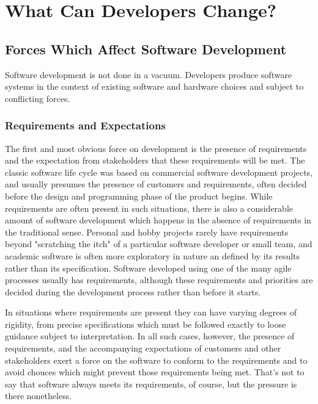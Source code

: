 \chapter{What Can Developers Change?}
\label{chapter:change}

\section{Forces Which Affect Software Development}
\label{section:forces which affect software development}

Software development is not done in a vacuum. Developers produce software systems in the context of existing software and hardware choices and subject to conflicting forces.

\subsection{Requirements and Expectations}
The first and most obvious force on development is the presence of requirements and the expectation from stakeholders that these requirements will be met. The classic software life cycle was based on commercial software development projects, and usually presumes the presence of customers and requirements, often decided before the design and programming phase of the product begins. While requirements are often present in such situations, there is also a considerable amount of software development which happens in the absence of requirements in the traditional sense. Personal and hobby projects rarely have requirements beyond "scratching the itch"  of a particular software developer or small team, and academic software is often more exploratory in nature an defined by its results rather than its specification. Software developed using one of the many agile processes  usually has requirements, although these requirements and priorities are decided during the development process rather than before it starts.

In situations where requirements are present they can have varying degrees of rigidity, from precise specifications which must be followed exactly to loose guidance subject to interpretation. In all such cases, however, the presence of requirements, and the accompanying expectations of customers and other stakeholders exert a force on the software to conform to the requirements and to avoid chouces which might prevent those requirements being met. That's not to say that software always meets its requirements, of course, but the pressure is there nonetheless.

